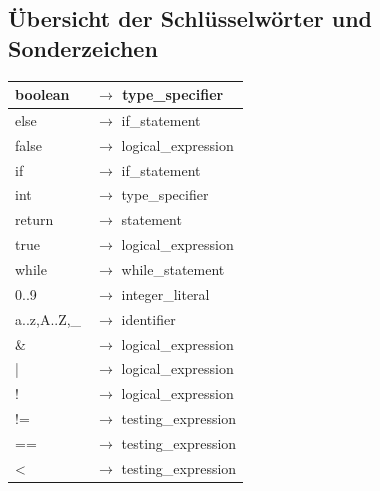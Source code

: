 \documentclass[10pt,a4paper,titlepage]{article}
\begin{document}
\subsection{\"{U}bersicht der Schl\"{u}sselw\"{o}rter und Sonderzeichen}
\begin{ttfamily}
\begin{tabular}{| l  l |}
\hline
\hspace*{1cm}boolean & $\to$ type\_specifier\hspace*{2cm}\\\hline
\hspace*{1cm}else & $\to$ if\_statement\hspace*{2cm}\\\hline
\hspace*{1cm}false & $\to$ logical\_expression\\\hline
\hspace*{1cm}if & $\to$ if\_statement\\\hline
\hspace*{1cm}int & $\to$ type\_specifier\\\hline
\hspace*{1cm}return & $\to$ statement\\\hline
\hspace*{1cm}true & $\to$ logical\_expression\\\hline
\hspace*{1cm}while & $\to$ while\_statement\\\hline
\hspace*{1cm}0..9 & $\to$ integer\_literal\\\hline
\hspace*{1cm}a..z,A..Z,\_\hspace*{0.5cm} & $\to$ identifier\\\hline
\hspace*{1cm}\& & $\to$ logical\_expression\\\hline
\hspace*{1cm}| & $\to$ logical\_expression\\\hline
\hspace*{1cm}! & $\to$ logical\_expression\\\hline
\hspace*{1cm}!= & $\to$ testing\_expression\\\hline
\hspace*{1cm}== & $\to$ testing\_expression\\\hline
\hspace*{1cm}< & $\to$ testing\_expression\\\hline

\end{tabular}
\end{ttfamily}
\end{document}
